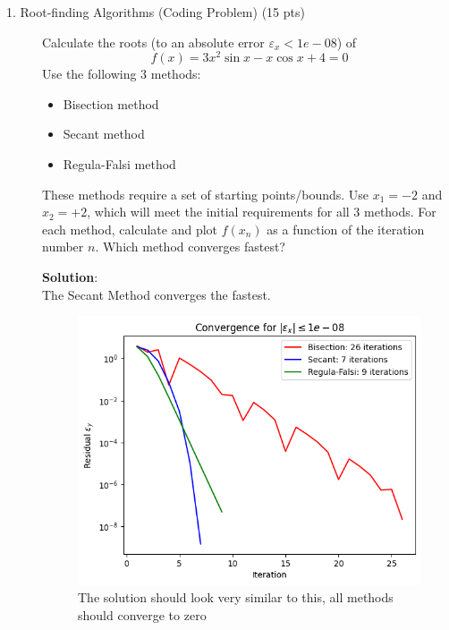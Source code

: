 \documentclass[12pt]{article}
\begin{document}
\begin{description}
\item[1. Root-finding Algorithms \color{red} (Coding Problem) \color{black} (15 pts)]
Calculate the roots (to an absolute error $\varepsilon_x < 1e-08$) of
    \begin{equation*}
        f (x) = 3x^{2}\sin{x} - x\cos{x} + 4 = 0
    \end{equation*}
Use the following 3 methods:
    \begin{itemize}
   	\item Bisection method
   	\item Secant method
   	\item Regula-Falsi method
    \end{itemize}

    These methods require a set of starting points/bounds. Use $x_1 = -2$ and $x_2 = +2$, which will meet the initial requirements for all 3 methods. For each method, calculate and plot $f(x_{n})$ as a function of the iteration number $n$. Which method converges fastest?
    
    \color{red}
    \ifsolution
    {\bf Solution}:\\ The Secant Method converges the fastest.
    
    \begin{figure}[h!]
    	\centering\includegraphics[width=4.5in]{HW1Fig1.png}
    	\caption{The solution should look very similar to this, all methods should converge to zero}
    	\label{fig:RootFindingAlgorithms}
    \end{figure}
    \fi
    \color{black}


\end{description}
\end{document}
